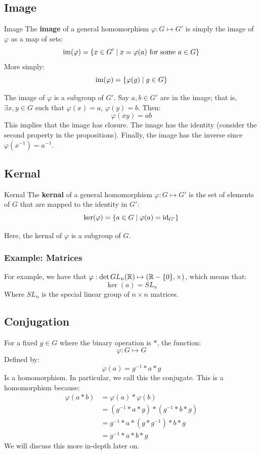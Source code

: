 \documentclass[letterpaper]{article}
\begin{document}
\subsection{Image}
\begin{definition}{Image}{}
    The \textbf{image} of a general homomorphism $\varphi: G \mapsto G'$ is simply the image of $\varphi$ as a map of sets: 
    \[\operatorname{im}(\varphi) = \{x \in G' \mid x = \varphi(a) \text{ for some } a \in G\}\]
    More simply: 
    \[\operatorname{im}(\varphi) = \{\varphi(g) \mid g \in G\}\]
\end{definition}
The image of $\varphi$ is a subgroup of $G'$. Say $a, b \in G'$ are in the image; that is, $\exists x, y \in G$ such that $\varphi(x) = a$, $\varphi(y) = b$. Then: 
\[\varphi(xy) = ab\]
This implies that the image has closure. The image has the identity (consider the second property in the propositions). Finally, the image has the inverse since $\varphi(x^{-1}) = a^{-1}$. 

\subsection{Kernal}
\begin{definition}{Kernal}{}
    The \textbf{kernal} of a general homomorphism $\varphi: G \mapsto G'$ is the set of elements of $G$ that are mapped to the identity in $G'$: 
    \[\ker(\varphi) = \{a \in G \mid \varphi(a) = \operatorname{id}_{G'}\}\]
\end{definition}
Here, the kernal of $\varphi$ is a subgroup of $G$. 


\subsubsection{Example: Matrices}
For example, we have that $\varphi: \det GL_n (\mathbb{R}) \mapsto (\mathbb{R} - \{0\}, \times)$, which means that: 
\[\ker(a) = SL_n\]
Where $SL_n$ is the special linear group of $n \times n$ matrices. 

\subsection{Conjugation}
For a fixed $g \in G$ where the binary operation is $*$, the function: 
\[\varphi: G \mapsto G\]
Defined by: 
\[\varphi(a) = g^{-1} * a * g\]
Is a homomorphism. In particular, we call this the conjugate. This is a homomorphism because: 
\begin{equation*}
    \begin{aligned}
        \varphi(a * b) &= \varphi(a) * \varphi(b) \\ 
            &= (g^{-1} * a * g) * (g^{-1} * b * g) \\ 
            &= g^{-1} * a * (g * g^{-1}) * b * g \\ 
            &= g^{-1} * a * b * g
    \end{aligned}
\end{equation*}
We will discuss this more in-depth later on. 
\end{document}
